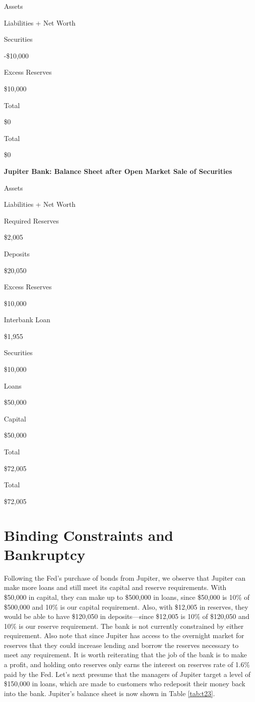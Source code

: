 \documentclass[
]{book}
\begin{document}
Assets

Liabilities + Net Worth

Securities

-\$10,000

Excess Reserves

\$10,000

Total

\$0

Total

\$0

\label{tab:t22}\textbf{Jupiter Bank: Balance Sheet after Open Market Sale of Securities}

Assets

Liabilities + Net Worth

Required Reserves

\$2,005

Deposits

\$20,050

Excess Reserves

\$10,000

Interbank Loan

\$1,955

Securities

\$10,000

Loans

\$50,000

Capital

\$50,000

Total

\$72,005

Total

\$72,005

\hypertarget{binding-constraints-and-bankruptcy}{%
\section{Binding Constraints and Bankruptcy}\label{binding-constraints-and-bankruptcy}}

Following the Fed's purchase of bonds from Jupiter, we observe that Jupiter can make more loans and still meet its capital and reserve requirements. With \$50,000 in capital, they can make up to \$500,000 in loans, since \$50,000 is 10\% of \$500,000 and 10\% is our capital requirement. Also, with \$12,005 in reserves, they would be able to have \$120,050 in deposits---since \$12,005 is 10\% of \$120,050 and 10\% is our reserve requirement. The bank is not currently constrained by either requirement. Also note that since Jupiter has access to the overnight market for reserves that they could increase lending and borrow the reserves necessary to meet any requirement. It is worth reiterating that the job of the bank is to make a profit, and holding onto reserves only earns the interest on reserves rate of 1.6\% paid by the Fed. Let's next presume that the managers of Jupiter target a level of \$150,000 in loans, which are made to customers who redeposit their money back into the bank. Jupiter's balance sheet is now shown in Table \ref{tab:t23}.
\end{document}
